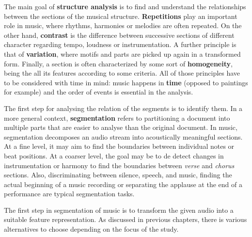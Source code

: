 \documentclass[a4paper, 9pt, twocolumn]{extarticle}
\begin{document}
The main goal of \textbf{structure analysis} is to find and understand the relationships between the sections of the musical structure. \textbf{Repetitions} play an important role in music, where rhythms, harmonies or melodies are often repeated. On the other hand, \textbf{contrast} is the difference between successive sections of different character regarding tempo, loudness or instrumentation. A further principle is that of \textbf{variation}, where motifs and parts are picked up again in a transformed form. Finally, a section is often characterized by some sort of \textbf{homogeneity}, being the all its features according to some criteria. All of those principles have to be considered with time in mind: music happens in \textbf{time} (opposed to paintings for example) and the order of events is essential in the analysis. 


%

The first step for analysing the relation of the segments is to identify them. In a more general context, \textbf{segmentation} refers to partitioning a document into multiple parts that are easier to analyse than the original document. In music, segmentation decomposes an audio stream into acoustically meaningful sections. At a fine level, it may aim to find the boundaries between individual notes or beat positions. At a coarser level, the goal may be to de detect changes in instrumentation or harmony to find the boundaries between \textit{verse} and \textit{chorus} sections. Also, discriminating between silence, speech, and music, finding the actual beginning of a music recording or separating the applause at the end of a performance are typical segmentation tasks.

The first step in segmentation of music is to transform the given audio into a suitable feature representation. As discussed in previous chapters, there is various alternatives to choose depending on the focus of the study. 
\end{document}
